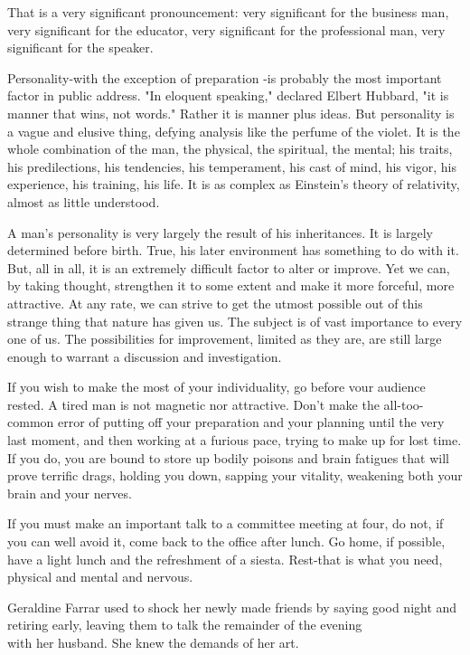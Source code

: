 \documentclass[10pt]{article}
\begin{document}
That is a very significant pronouncement: very significant for the business man, very significant for the educator, very significant for the professional man, very significant for the speaker.

Personality-with the exception of preparation -is probably the most important factor in public address. "In eloquent speaking," declared Elbert Hubbard, "it is manner that wins, not words." Rather it is manner plus ideas. But personality is a vague and elusive thing, defying analysis like the perfume of the violet. It is the whole combination of the man, the physical, the spiritual, the mental; his traits, his predilections, his tendencies, his temperament, his cast of mind, his vigor, his experience, his training, his life. It is as complex as Einstein's theory of relativity, almost as little understood.

A man's personality is very largely the result of his inheritances. It is largely determined before birth. True, his later environment has something to do with it. But, all in all, it is an extremely difficult factor to alter or improve. Yet we can, by taking thought, strengthen it to some extent and make it more forceful, more attractive. At any rate, we can strive to get the utmost possible out of this strange thing that nature has given us. The subject is of vast importance to every one of us. The possibilities for improvement, limited as they are, are still large enough to warrant a discussion and investigation.

If you wish to make the most of your individuality, go before vour audience rested. A tired man is not magnetic nor attractive. Don't make the all-too-common error of putting off your preparation and your planning until the very last moment, and then working at a furious pace, trying to make up for lost time. If you do, you are bound to store up bodily poisons and brain fatigues that will prove terrific drags, holding you down, sapping your vitality, weakening both your brain and your nerves.

If you must make an important talk to a committee meeting at four, do not, if you can well avoid it, come back to the office after lunch. Go home, if possible, have a light lunch and the refreshment of a siesta. Rest-that is what you need, physical and mental and nervous.

Geraldine Farrar used to shock her newly made friends by saying good night and retiring early, leaving them to talk the remainder of the evening\\
with her husband. She knew the demands of her art.
\end{document}
